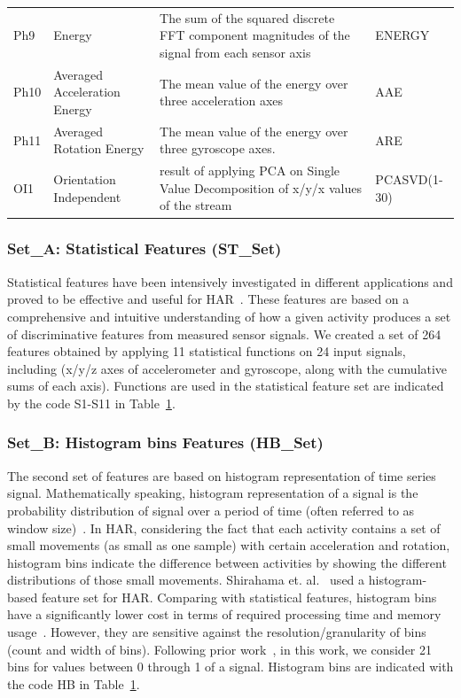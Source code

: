 \documentclass[journal,article,submit,moreauthors,pdftex]{Definitions/mdpi}
\begin{document}
\begin{table}[H]
\begin{tabular}{p{0.9cm}p{5cm}p{7cm}p{1.3cm}}
		Ph9&Energy&{\scriptsize The sum of the squared discrete FFT component magnitudes of the signal from each sensor axis} & ENERGY \\
		Ph10&Averaged Acceleration Energy&{\scriptsize The mean value of the energy over three acceleration axes} & AAE \\
		Ph11&Averaged Rotation Energy&{\scriptsize The mean value of the energy over three gyroscope axes. } & ARE \\
		OI1&Orientation Independent&{\scriptsize result of applying PCA on Single Value Decomposition  of x/y/x values of the stream } & PCASVD(1-30) \\
		\bottomrule
	\end{tabular}
	\label{features_table}
\end{table}


\subsubsection{Set\_A: Statistical Features (ST\_Set)}
Statistical features have been intensively investigated in different applications and proved to be effective and useful for HAR~\cite{rosati2018comparison}. These features are based on a comprehensive and intuitive understanding of how a given activity produces a set of discriminative features from measured sensor signals. We created a set of 264 features obtained by applying 11 statistical functions on 24 input signals, including (x/y/z axes of accelerometer and gyroscope, along with the cumulative sums of each axis). Functions are used in the statistical feature set are indicated by the code S1-S11 in Table~\ref{features_table}. 

\subsubsection{Set\_B: Histogram bins Features (HB\_Set)}
The second set of features are based on histogram representation of time series signal. Mathematically speaking, histogram representation of a signal is the probability distribution of signal over a period of time (often referred to as window size)~\cite{zardoshti1995emg}. In HAR, considering the fact that each activity contains a set of small movements (as small as one sample) with certain acceleration and rotation, histogram bins indicate the difference between activities by showing the different distributions of those small movements. Shirahama et. al.~\cite{shirahama2016codebook} used a histogram-based feature set for HAR. Comparing with statistical features, histogram bins have a significantly lower cost in terms of required processing time and memory usage~\cite{Sarbishei2019platform}. However, they are sensitive against the resolution/granularity of bins (count and width of bins). Following prior work~\cite{xi2017evaluation}, in this work, we consider 21 bins for values between 0 through 1 of a signal. Histogram bins are indicated with the code HB in Table~\ref{features_table}.
\end{document}
